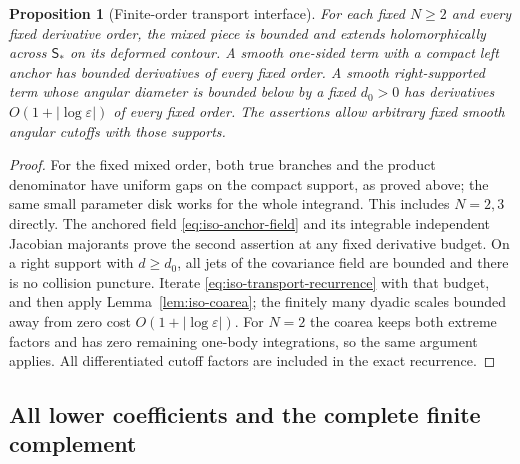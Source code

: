 \documentclass[11pt]{article}
\numberwithin{equation}{section}
\newtheorem{proposition}[theorem]{Proposition}
\theoremstyle{definition}
\newcommand{\eps}{\varepsilon}
\begin{document}
\begin{proposition}[Finite-order transport interface]
\label{prop:iso-finite-transport}
For each fixed $N\ge2$ and every fixed derivative order, the mixed
piece is bounded and extends holomorphically across
$\mathsf S_*$ on its deformed contour.  A smooth one-sided term with
a compact left anchor has bounded derivatives of every fixed order.
A smooth right-supported term whose angular diameter is bounded
below by a fixed $d_0>0$ has derivatives
$O(1+|\log\eps|)$ of every fixed order.  The assertions allow
arbitrary fixed smooth angular cutoffs with those supports.
\end{proposition}
\begin{proof}
For the fixed mixed order, both true branches and the product
denominator have uniform gaps on the compact support, as proved
above; the same small parameter disk works for the whole integrand.
This includes $N=2,3$ directly.  The anchored field
\eqref{eq:iso-anchor-field} and its integrable independent Jacobian
majorants prove the second assertion at any fixed derivative budget.
On a right support with $d\ge d_0$, all jets of the covariance
field are bounded and there is no collision puncture.  Iterate
\eqref{eq:iso-transport-recurrence} with that budget, and then apply
Lemma~\ref{lem:iso-coarea}; the finitely many dyadic scales bounded
away from zero cost $O(1+|\log\eps|)$.  For $N=2$ the coarea keeps
both extreme factors and has zero remaining one-body integrations,
so the same argument applies.  All differentiated cutoff factors
are included in the exact recurrence.
\end{proof}


\subsection{All lower coefficients and the complete finite complement}
\end{document}
